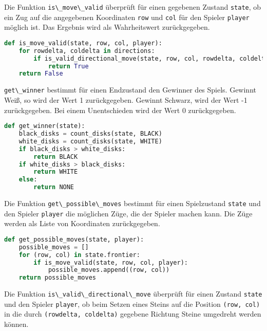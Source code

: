 Die Funktion \passthrough{\lstinline!is\_move\_valid!} überprüft für
einen gegebenen Zustand \passthrough{\lstinline!state!}, ob ein Zug auf
die angegebenen Koordinaten \passthrough{\lstinline!row!} und
\passthrough{\lstinline!col!} für den Spieler
\passthrough{\lstinline!player!} möglich ist. Das Ergebnis wird als
Wahrheitswert zurückgegeben.

\begin{lstlisting}[language=Python]
def is_move_valid(state, row, col, player):
    for rowdelta, coldelta in directions:
        if is_valid_directional_move(state, row, col, rowdelta, coldelta, player):
            return True
    return False
\end{lstlisting}

\passthrough{\lstinline!get\_winner!} bestimmt für einen Endzustand den
Gewinner des Spiels. Gewinnt Weiß, so wird der Wert 1 zurückgegeben.
Gewinnt Schwarz, wird der Wert -1 zurückgegeben. Bei einem Unentschieden
wird der Wert 0 zurückgegeben.

\begin{lstlisting}[language=Python]
def get_winner(state):
    black_disks = count_disks(state, BLACK)
    white_disks = count_disks(state, WHITE)
    if black_disks > white_disks:
        return BLACK
    if white_disks > black_disks:
        return WHITE
    else:
        return NONE
\end{lstlisting}

Die Funktion \passthrough{\lstinline!get\_possible\_moves!} bestimmt für
einen Spielzustand \passthrough{\lstinline!state!} und den Spieler
\passthrough{\lstinline!player!} die möglichen Züge, die der Spieler
machen kann. Die Züge werden als Liste von Koordinaten zurückgegeben.

\begin{lstlisting}[language=Python]
def get_possible_moves(state, player):
    possible_moves = []
    for (row, col) in state.frontier:
        if is_move_valid(state, row, col, player):
            possible_moves.append((row, col))
    return possible_moves
\end{lstlisting}

Die Funktion \passthrough{\lstinline!is\_valid\_directional\_move!}
überprüft für einen Zustand \passthrough{\lstinline!state!} und den
Spieler \passthrough{\lstinline!player!}, ob beim Setzen eines Steins
auf die Position \passthrough{\lstinline!(row, col)!} in die durch
\passthrough{\lstinline!(rowdelta, coldelta)!} gegebene Richtung Steine
umgedreht werden können.

